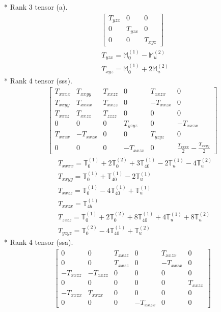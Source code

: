 \documentclass[fleqn,8pt,landscape]{jsarticle}
\begin{document}
* Rank 3 tensor (a).
\begin{align*}
\begin{bmatrix} T_{yzx} & 0 & 0 \\ 0 & T_{yzx} & 0 \\ 0 & 0 & T_{xyz} \end{bmatrix}
\end{align*}
\begin{align*}
& T_{yzx} = \mathbb{M}_{0}^{(1)} - \mathbb{M}_{u}^{(2)} \\
& T_{xyz} = \mathbb{M}_{0}^{(1)} + 2 \mathbb{M}_{u}^{(2)}
\end{align*}
* Rank 4 tensor (sss).
\begin{align*}
\begin{bmatrix} T_{xxxx} & T_{xxyy} & T_{xxzz} & 0 & T_{xxzx} & 0 \\ T_{xxyy} & T_{xxxx} & T_{xxzz} & 0 & - T_{xxzx} & 0 \\ T_{xxzz} & T_{xxzz} & T_{zzzz} & 0 & 0 & 0 \\ 0 & 0 & 0 & T_{yzyz} & 0 & - T_{xxzx} \\ T_{xxzx} & - T_{xxzx} & 0 & 0 & T_{yzyz} & 0 \\ 0 & 0 & 0 & - T_{xxzx} & 0 & \frac{T_{xxxx}}{2} - \frac{T_{xxyy}}{2} \end{bmatrix}
\end{align*}
\begin{align*}
& T_{xxxx} = \mathbb{T}_{0}^{(1)} + 2 \mathbb{T}_{0}^{(2)} + 3 \mathbb{T}_{40}^{(1)} - 2 \mathbb{T}_{u}^{(1)} - 4 \mathbb{T}_{u}^{(2)} \\
& T_{xxyy} = \mathbb{T}_{0}^{(1)} + \mathbb{T}_{40}^{(1)} - 2 \mathbb{T}_{u}^{(1)} \\
& T_{xxzz} = \mathbb{T}_{0}^{(1)} - 4 \mathbb{T}_{40}^{(1)} + \mathbb{T}_{u}^{(1)} \\
& T_{xxzx} = \mathbb{T}_{4b}^{(1)} \\
& T_{zzzz} = \mathbb{T}_{0}^{(1)} + 2 \mathbb{T}_{0}^{(2)} + 8 \mathbb{T}_{40}^{(1)} + 4 \mathbb{T}_{u}^{(1)} + 8 \mathbb{T}_{u}^{(2)} \\
& T_{yzyz} = \mathbb{T}_{0}^{(2)} - 4 \mathbb{T}_{40}^{(1)} + \mathbb{T}_{u}^{(2)}
\end{align*}
* Rank 4 tensor (ssa).
\begin{align*}
\begin{bmatrix} 0 & 0 & T_{xxzz} & 0 & T_{xxzx} & 0 \\ 0 & 0 & T_{xxzz} & 0 & - T_{xxzx} & 0 \\ - T_{xxzz} & - T_{xxzz} & 0 & 0 & 0 & 0 \\ 0 & 0 & 0 & 0 & 0 & T_{xxzx} \\ - T_{xxzx} & T_{xxzx} & 0 & 0 & 0 & 0 \\ 0 & 0 & 0 & - T_{xxzx} & 0 & 0 \end{bmatrix}
\end{align*}
\end{document}
